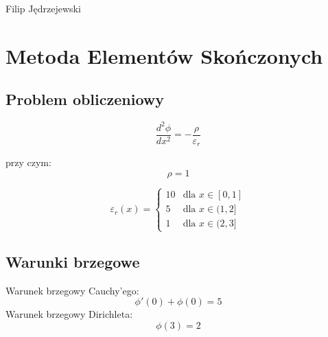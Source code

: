 \documentclass{article}
\begin{document}
	Filip Jędrzejewski
	
	\section{Metoda Elementów Skończonych}
	
	\subsection{Problem obliczeniowy}
	
	\begin{equation}
		\frac{d^2\phi}{dx^2} = -\frac{\rho}{\varepsilon_r}
	\end{equation}
	
	przy czym:
	\begin{equation}
		\rho = 1
	\end{equation}
	
	\begin{equation}
		\varepsilon_r(x) =\left\{ \begin{array}{rl}
					10 & \textrm{dla $x \in [0,1]$} \\ 
					5 & \textrm{dla $x \in (1,2]$} \\
					1 & \textrm{dla $x \in (2,3]$}
					\end{array} \right.
	\end{equation}
	
	\subsection{Warunki brzegowe}
	Warunek brzegowy Cauchy'ego:
	\begin{equation}
		\phi '(0)+\phi (0) = 5
	\end{equation}
	 Warunek brzegowy Dirichleta:
	 \begin{equation}
	 	\phi (3) = 2
	 \end{equation}
	 
	 
\end{document}
